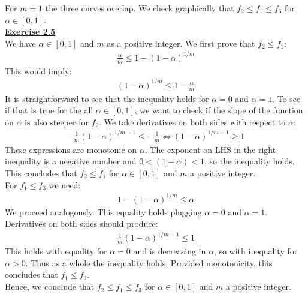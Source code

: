 \documentclass[a4paper, 11pt]{article}
\begin{document}
For $m=1$ the three curves overlap. We check graphically that $f_2 \leq f_1 \leq f_3$ for $\alpha \in [0,1]$.\\
\newline \textbf{\underline{Exercise 2.5}}\\
\newline We have $\alpha \in [0,1]$ and $m$ as a positive integer. We first prove that $f_2 \leq f_1$:
\begin{eqnarray}
\frac{\alpha}{m} \leq 1 - (1- \alpha)^{1/m} \nonumber
\end{eqnarray}
This would imply:
\begin{eqnarray}
(1-\alpha)^{1/m} \leq 1 - \frac{\alpha}{m} \nonumber
\end{eqnarray}
\newline It is straightforward to see that the inequality holds for $\alpha = 0$ and $\alpha=1$. To see if that is true for the all $\alpha \in [0,1]$, we want to check if the slope of the function on $\alpha$ is also steeper for $f_2$. We take derivatives on both sides with respect to $\alpha$:
\begin{eqnarray}
-\frac{1}{m} (1-\alpha)^{1/m -1} \leq -\frac{1}{m}  \Leftrightarrow (1-\alpha)^{1/m -1} \geq 1 \nonumber
\end{eqnarray}
These expressions are monotonic on  $\alpha$. The exponent on LHS in the right inequality is a negative number and $0<(1-\alpha)<1$, so the inequality holds. This concludes that $f_2 \leq f_1$ for $\alpha \in [0,1]$ and $m$ a positive integer.\\
\newline For $f_1 \leq f_3$ we need:
\begin{eqnarray}
1 - (1- \alpha)^{1/m} \leq \alpha \nonumber
\end{eqnarray}
We proceed analogously. This equality holds plugging $\alpha=0$ and $\alpha=1$. Derivatives on both sides should produce:
\begin{eqnarray}
\frac{1}{m} (1-\alpha)^{1/m -1} \leq 1 \nonumber
\end{eqnarray}
This holds with equality for $\alpha=0$ and is decreasing in $\alpha$, so with inequality for $\alpha>0$. Thus as a whole the inequality holds. Provided monotonicity, this concludes that $f_1 \leq f_3$.\\
\newline Hence, we conclude that $f_2 \leq f_1 \leq f_3$ for $\alpha \in [0,1]$ and $m$ a positive integer.\\
\end{document}
